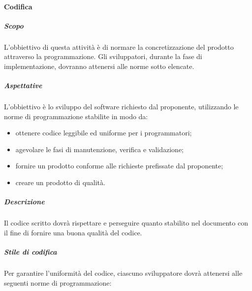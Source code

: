 			\paragraph{Codifica}
				\subparagraph{Scopo}
					L'obbiettivo di questa attività è di normare la concretizzazione del prodotto attraverso la programmazione. Gli sviluppatori, durante la fase di implementazione, dovranno attenersi alle norme sotto elencate.
				\subparagraph{Aspettative}
					 L'obbiettivo è lo sviluppo del software richiesto dal proponente, utilizzando le norme di programmazione stabilite in modo da:
					 	\begin{itemize}
					 	\item ottenere codice leggibile ed uniforme per i programmatori;
						\item agevolare le fasi di manutenzione, verifica e validazione;
						\item fornire un prodotto conforme alle richieste prefissate dal proponente;
						\item creare un prodotto di qualità.
					 \end{itemize}
				 \subparagraph{Descrizione}
				 	Il codice scritto dovrà rispettare e perseguire quanto stabilito nel documento  con il fine di fornire una buona qualità del codice.
				 \subparagraph{Stile di codifica}
				 	Per garantire l'uniformità del codice, ciascuno sviluppatore dovrà attenersi alle seguenti norme di programmazione:

